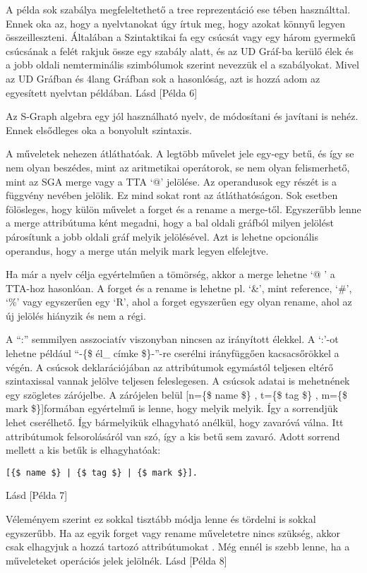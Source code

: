A példa sok szabálya megfeleltethető a tree reprezentáció ese tében használttal. Ennek oka az, hogy a nyelvtanokat úgy írtuk meg, hogy azokat könnyű legyen összeilleszteni. Általában a Szintaktikai fa egy csúcsát vagy egy három gyermekű csúcsának a felét rakjuk össze egy szabály alatt, és az UD Gráf-ba kerülő élek és a jobb oldali nemterminális szimbólumok szerint nevezzük el a szabályokat. Mivel az UD Gráfban és 4lang Gráfban sok a hasonlóság, azt is hozzá adom az egyesített nyelvtan példában. Lásd [Példa 6]

Az S-Graph algebra egy jól használható nyelv, de módosítani és javítani is nehéz. Ennek elsődleges oka a bonyolult szintaxis.

A műveletek nehezen átláthatóak. A legtöbb művelet jele egy-egy betű, és így se nem olyan beszédes, mint az aritmetikai operátorok, se nem olyan felismerhető, mint az SGA merge vagy a TTA ‘@’ jelölése. Az operandusok egy részét is a függvény nevében jelölik.  Ez mind sokat ront az átláthatóságon. Sok esetben fölösleges, hogy külön művelet a forget és a rename a merge-től. Egyszerűbb lenne a merge attribútuma ként megadni, hogy a bal oldali gráfból milyen jelölést párosítunk a jobb oldali gráf melyik jelölésével. Azt is lehetne opcionális operandus, hogy a merge után melyik mark legyen elfelejtve.

Ha már a nyelv célja egyértelműen a tömörség, akkor a merge lehetne ‘@ ’ a TTA-hoz hasonlóan. A forget és a rename is lehetne pl. ‘\&’, mint reference, ‘\#’, ‘\%’ vagy egyszerűen egy ‘R’, ahol a forget egyszerűen egy olyan rename, ahol az új jelölés hiányzik és nem a régi.

A “:” semmilyen asszociatív viszonyban nincsen az irányított élekkel. A ‘:’-ot lehetne például “-\{\$ él\_ címke \$\}-”-re cserélni irányfüggően kacsacsőrökkel a végén.
A csúcsok deklarációjában az attribútumok egymástól teljesen eltérő szintaxissal vannak jelölve teljesen feleslegesen. A csúcsok adatai is mehetnének egy szögletes zárójelbe. A zárójelen belül [n=\{\$ name \$\} , t=\{\$ tag \$\} , m=\{\$ mark \$\}]formában egyértelmű is lenne, hogy melyik melyik. Így a sorrendjük lehet cserélhető. Így bármelyikük elhagyható anélkül, hogy zavaróvá válna. Itt attribútumok felsorolásáról van szó, így a kis betű sem zavaró. Adott sorrend mellett a kis betűk is elhagyhatóak:
\begin{verbatim}
[{$ name $} | {$ tag $} | {$ mark $}].
\end{verbatim}
Lásd [Példa 7]

Véleményem szerint ez sokkal tisztább módja lenne és tördelni is sokkal egyszerűbb. Ha az egyik forget vagy rename műveletetre nincs szükség, akkor csak elhagyjuk a hozzá tartozó attribútumokat . Még ennél is szebb lenne, ha a műveleteket operációs jelek jelölnék. Lásd [Példa 8]

